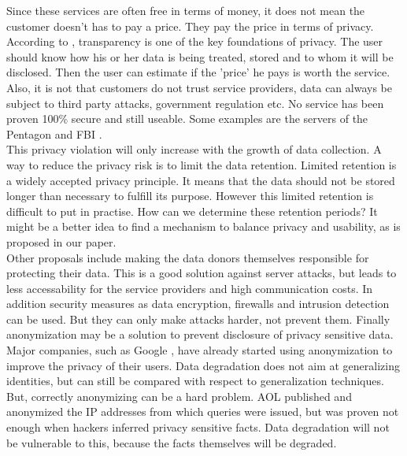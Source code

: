 \documentclass[a4paper,12pt,oneside,fleqn]{article}
\begin{document}
Since these services are often free in terms of money, it does not
mean the customer doesn't has to pay a price. They pay the price in
terms of privacy. According to \cite{Jiang}, transparency is one of
the key foundations of privacy. The user should know how his or her
data is being treated, stored and to whom it will be disclosed. Then
the user can estimate if the 'price' he pays is worth the service.\\

Also, it is not that customers do not trust service providers, data
can always be subject to third party attacks, government regulation
etc. No service has been proven 100\% secure and still useable. Some
examples are the servers of the Pentagon \cite{Pentagon} and FBI
\cite{FBI}. \\

This privacy violation will only increase with the growth of data
collection. A way to reduce the privacy risk is to limit the data
retention. Limited retention is a widely accepted privacy
principle. It means that the data should not be stored longer than
necessary to fulfill its purpose.\cite{hippocratic-dbs} However this
limited retention is difficult to put in practise. How can we
determine these retention periods? It might be a better idea to find a
mechanism to balance privacy and usability, as is proposed in our
paper. \cite{Heerde}\\

Other proposals include making the data donors themselves responsible
for protecting their data.\cite{Aggarwal} \cite{W3C} This is a good
solution against server attacks, but leads to less accessability for
the service providers and high communication costs. In addition
security measures as data encryption, firewalls and intrusion
detection can be used. But they can only make attacks harder, not
prevent them. Finally anonymization may be a solution to prevent
disclosure of privacy sensitive data. Major companies, such as Google
\cite{Fleischer}, have already started using anonymization to improve
the privacy of their users. Data degradation does not aim at
generalizing identities, but can still be compared with respect to
generalization techniques. But, correctly anonymizing can be a hard
problem. AOL published and anonymized the IP addresses from which
queries were issued, but was proven not enough when hackers inferred
privacy sensitive facts. \cite{Hillyard} Data degradation will not be
vulnerable to this, because the facts themselves will be degraded.
\end{document}
